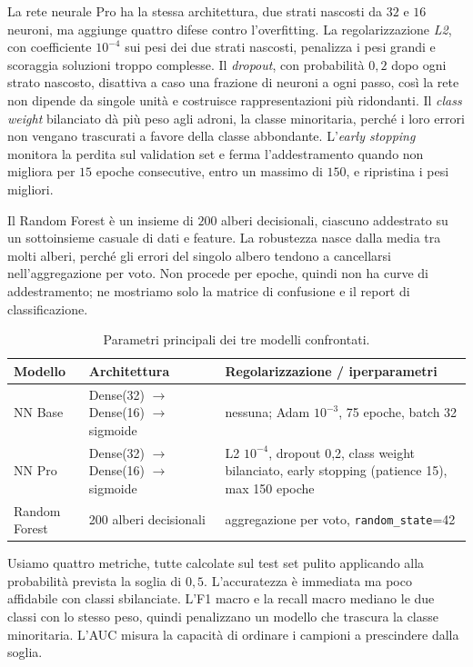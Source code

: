 \documentclass[12pt,a4paper]{article}
\begin{document}
La rete neurale Pro ha la stessa architettura, due strati nascosti da $32$ e $16$ neuroni, ma aggiunge
quattro difese contro l'overfitting. La regolarizzazione \emph{L2}, con coefficiente $10^{-4}$ sui pesi
dei due strati nascosti, penalizza i pesi grandi e scoraggia soluzioni troppo complesse. Il
\emph{dropout}, con probabilità $0{,}2$ dopo ogni strato nascosto, disattiva a caso una frazione di
neuroni a ogni passo, così la rete non dipende da singole unità e costruisce rappresentazioni più
ridondanti. Il \emph{class weight} bilanciato dà più peso agli adroni, la classe minoritaria, perché i
loro errori non vengano trascurati a favore della classe abbondante. L'\emph{early stopping} monitora
la perdita sul validation set e ferma l'addestramento quando non migliora per $15$ epoche consecutive,
entro un massimo di $150$, e ripristina i pesi migliori. 

Il Random Forest è un insieme di $200$ alberi decisionali, ciascuno addestrato su un sottoinsieme
casuale di dati e feature. La robustezza nasce dalla media tra molti alberi, perché gli errori del
singolo albero tendono a cancellarsi nell'aggregazione per voto. Non procede per epoche, quindi non ha
curve di addestramento; ne mostriamo solo la matrice di confusione e il report di classificazione.

\begin{table}[H]\centering\small
\caption{Parametri principali dei tre modelli confrontati.}\label{tab:modelli}
\begin{tabular}{@{}l p{4.6cm} p{6.8cm}@{}}
\toprule
\textbf{Modello} & \textbf{Architettura} & \textbf{Regolarizzazione / iperparametri} \\
\midrule
NN Base & Dense(32) $\to$ Dense(16) $\to$ sigmoide & nessuna; Adam $10^{-3}$, 75 epoche, batch 32 \\[4pt]
NN Pro & Dense(32) $\to$ Dense(16) $\to$ sigmoide & L2 $10^{-4}$, dropout 0,2, class weight bilanciato, early stopping (patience 15), max 150 epoche \\[4pt]
Random Forest & 200 alberi decisionali & aggregazione per voto, \texttt{random\_state}=42 \\
\bottomrule
\end{tabular}
\end{table}

Usiamo quattro metriche, tutte calcolate sul test set pulito applicando alla probabilità prevista la
soglia di $0{,}5$. L'accuratezza è immediata ma poco affidabile con classi sbilanciate. L'F1 macro e la
recall macro mediano le due classi con lo stesso peso, quindi penalizzano un modello che trascura la
classe minoritaria. L'AUC misura la capacità di ordinare i campioni a prescindere dalla soglia.
\end{document}
